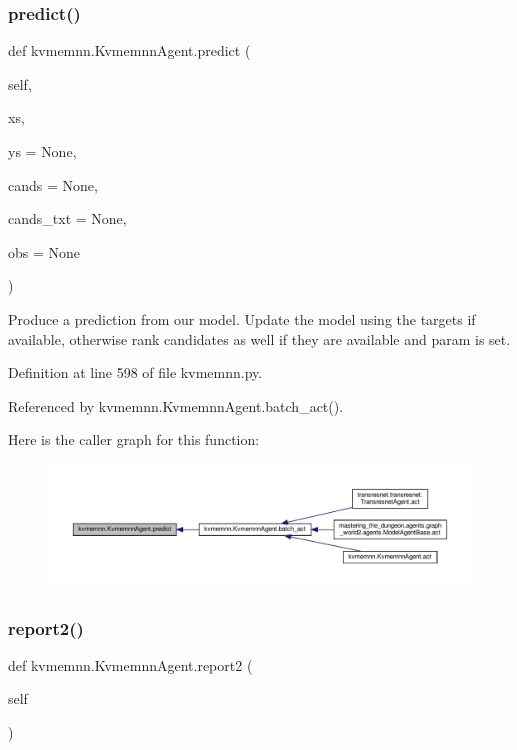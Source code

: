\subsubsection{\texorpdfstring{predict()}{predict()}}
{\footnotesize\ttfamily def kvmemnn.\+Kvmemnn\+Agent.\+predict (\begin{DoxyParamCaption}\item[{}]{self,  }\item[{}]{xs,  }\item[{}]{ys = {\ttfamily None},  }\item[{}]{cands = {\ttfamily None},  }\item[{}]{cands\+\_\+txt = {\ttfamily None},  }\item[{}]{obs = {\ttfamily None} }\end{DoxyParamCaption})}

\begin{DoxyVerb}Produce a prediction from our model.
Update the model using the targets if available, otherwise rank
candidates as well if they are available and param is set.
\end{DoxyVerb}
 

Definition at line 598 of file kvmemnn.\+py.



Referenced by kvmemnn.\+Kvmemnn\+Agent.\+batch\+\_\+act().

Here is the caller graph for this function\+:
\nopagebreak
\begin{figure}[H]
\begin{center}
\leavevmode
\includegraphics[width=350pt]{classkvmemnn_1_1KvmemnnAgent_ac2b07b1455920e6a343271997b9c6207_icgraph}
\end{center}
\end{figure}
\mbox{\label{classkvmemnn_1_1KvmemnnAgent_af8c3f5e8c17e1f1355eb2e416fd92e26}} 
\subsubsection{\texorpdfstring{report2()}{report2()}}
{\footnotesize\ttfamily def kvmemnn.\+Kvmemnn\+Agent.\+report2 (\begin{DoxyParamCaption}\item[{}]{self }\end{DoxyParamCaption})}



